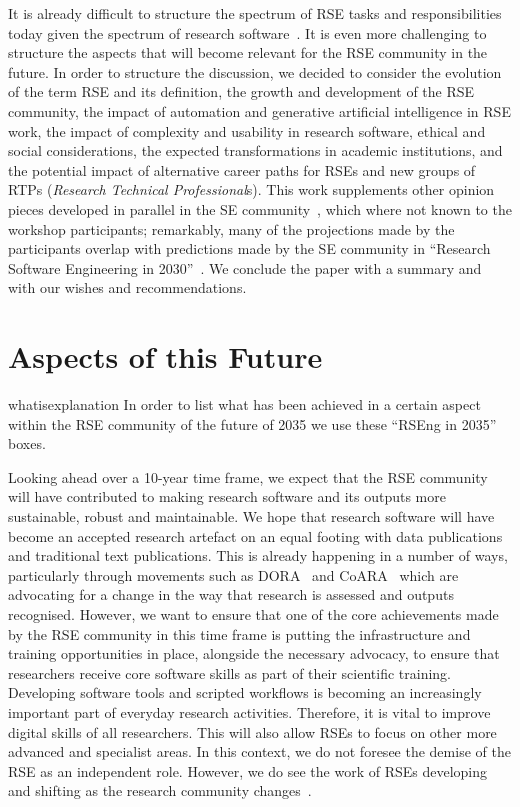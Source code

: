 \documentclass{eceasst}
\begin{document}
It is already difficult to structure the spectrum of RSE tasks and responsibilities
today given the spectrum of research software~\cite{Hasselbring2024}.
It is even more challenging to structure the aspects that will become relevant for the RSE community in the future.
In order to structure the discussion, we decided to consider
the evolution of the term RSE and its definition,
the growth and development of the RSE community,
the impact of automation and generative artificial intelligence in RSE work,
the impact of complexity and usability in research software,
ethical and social considerations,
the expected transformations in academic institutions,
and the potential impact of alternative career paths for RSEs
and new groups of RTPs (\emph{Research Technical Professional}s).
This work supplements other opinion pieces developed in parallel
in the SE community~\cite{ChueHong2025,Sochat2024Infra,Bencomo2024AEBoK,OliveiraJr2024,Druskat2025,Carleton2022},
which where not known to the workshop participants; remarkably,
many of the projections made by the participants overlap with predictions made
by the SE community in ``Research Software Engineering in 2030''~\cite{Katz2023}.
We conclude the paper with a summary and with our wishes and recommendations.

\section{Aspects of this Future}
\begin{whatis}{}{whatisexplanation}
In order to list what has been achieved in a certain aspect within the RSE community of the future of 2035 we use these ``RSEng in 2035'' boxes.
\end{whatis}

Looking ahead over a 10-year time frame, we expect that the RSE community will have
contributed to making research software and its outputs
more sustainable, robust and maintainable.
We hope that research software will have become an accepted research artefact on an equal footing with data publications and traditional text publications.
This is already happening in a number of ways,
particularly through movements such as DORA~\cite{DORA} and CoARA~\cite{COARA} which are advocating for a change in the way that research is assessed and outputs recognised.
However, we want to ensure that one of the core achievements made by the RSE community in this time
frame is putting the infrastructure and training opportunities in place, alongside the necessary
advocacy, to ensure that researchers receive core software skills as part of their scientific training.
Developing software tools and scripted workflows is becoming an increasingly important part of everyday
research activities.
Therefore, it is vital to improve digital skills of all researchers.
This will also allow RSEs to focus on other more advanced and specialist areas.
In this context, we do not foresee the demise of the RSE as an independent role.
However, we do see the work of RSEs developing and shifting as the research community changes~\cite{ChueHong2025}.
\end{document}
